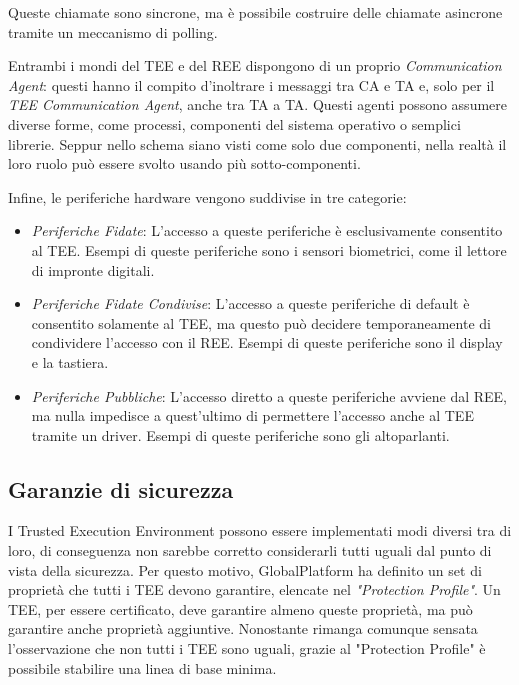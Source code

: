 \documentclass[12pt,italian]{report}
\begin{document}
Queste chiamate sono sincrone, ma è possibile costruire delle chiamate
asincrone tramite un meccanismo di polling.

Entrambi i mondi del TEE e del REE dispongono di un proprio
\textit{Communication Agent}: questi 
hanno il compito d'inoltrare i messaggi tra CA e TA e, solo per il
\textit{TEE Communication Agent}, anche tra TA a TA.
Questi agenti possono assumere diverse forme, come processi, componenti
del sistema operativo o semplici librerie.
Seppur nello schema siano visti come solo due componenti, nella realtà
il loro ruolo può essere svolto usando più sotto-componenti.

\bigbreak

\noindent Infine, le periferiche hardware vengono suddivise in tre categorie:
\begin{itemize}
    \item \textit{Periferiche Fidate}: L'accesso a queste periferiche è
    esclusivamente consentito al TEE. Esempi di queste periferiche sono i
    sensori biometrici, come il lettore di impronte digitali. 
    \item \textit{Periferiche Fidate Condivise}: L'accesso a queste
    periferiche di default è consentito solamente al TEE, ma questo può
    decidere temporaneamente di condividere l'accesso con il REE. Esempi di
    queste periferiche sono il display e la tastiera.
    \item \textit{Periferiche Pubbliche}: L'accesso diretto a queste
    periferiche avviene dal REE, ma nulla impedisce a quest'ultimo di
    permettere l'accesso anche al TEE tramite un driver. Esempi di queste
    periferiche sono gli altoparlanti.
\end{itemize}

\subsection{Garanzie di sicurezza}
\label{subsec:garanzie-sicurezza}
I Trusted Execution Environment possono essere implementati modi diversi
tra di loro, di conseguenza non sarebbe corretto considerarli tutti
uguali dal punto di vista della sicurezza.
Per questo motivo, GlobalPlatform ha definito un set di proprietà che
tutti i TEE devono garantire, elencate nel
\textit{"Protection Profile"}\cite{gp2020protectionprofile}.
Un TEE, per essere certificato, deve garantire almeno queste proprietà, ma
può garantire anche proprietà aggiuntive.
Nonostante rimanga comunque sensata l'osservazione che non tutti i TEE
sono uguali, grazie al "Protection Profile" è possibile stabilire una
linea di base minima. 
\end{document}
